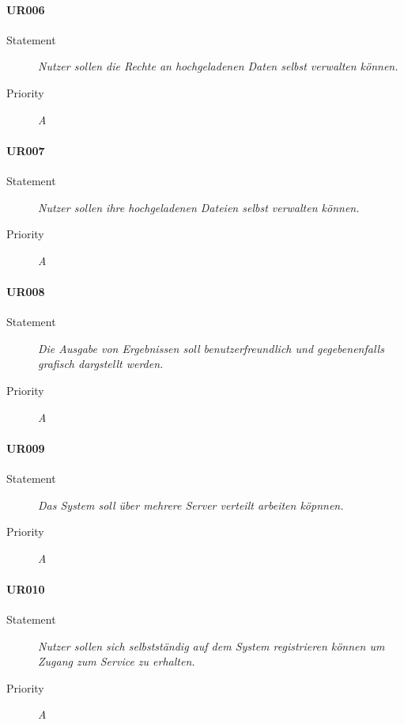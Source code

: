 \paragraph{UR006}
\begin{description}
\item[Statement] \textit{Nutzer sollen die Rechte an hochgeladenen Daten selbst verwalten können.}
\item[Priority] \textit{A}
\end{description}

\paragraph{UR007}
\begin{description}
\item[Statement] \textit{Nutzer sollen ihre hochgeladenen Dateien selbst verwalten können.}
\item[Priority] \textit{A}
\end{description}

\paragraph{UR008}
\begin{description}
\item[Statement] \textit{Die Ausgabe von Ergebnissen soll benutzerfreundlich und gegebenenfalls grafisch dargstellt werden.}
\item[Priority] \textit{A}
\end{description}

\paragraph{UR009}
\begin{description}
\item[Statement] \textit{Das System soll über mehrere Server verteilt arbeiten köpnnen.}
\item[Priority] \textit{A}
\end{description}

\paragraph{UR010}
\begin{description}
\item[Statement] \textit{Nutzer sollen sich selbstständig auf dem System registrieren können um Zugang zum Service zu erhalten.}
\item[Priority] \textit{A}
\end{description}

